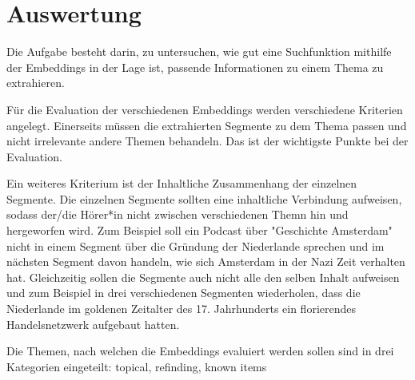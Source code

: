 \section{Auswertung}


Die Aufgabe besteht darin, zu untersuchen, wie gut eine Suchfunktion mithilfe der Embeddings in der Lage ist, passende Informationen zu einem Thema zu extrahieren.

Für die Evaluation der verschiedenen Embeddings werden verschiedene Kriterien angelegt.
Einerseits müssen die extrahierten Segmente zu dem Thema passen und nicht irrelevante andere Themen behandeln.
Das ist der wichtigste Punkte bei der Evaluation.

Ein weiteres Kriterium ist der Inhaltliche Zusammenhang der einzelnen Segmente.
Die einzelnen Segmente sollten eine inhaltliche Verbindung aufweisen, sodass der/die Hörer*in nicht zwischen verschiedenen Themn hin und hergeworfen wird.
Zum Beispiel soll ein Podcast über "Geschichte Amsterdam" nicht in einem Segment über die Gründung der Niederlande sprechen und im nächsten Segment davon handeln, wie sich Amsterdam in der Nazi Zeit verhalten hat.
Gleichzeitig sollen die Segmente auch nicht alle den selben Inhalt aufweisen und zum Beispiel in drei verschiedenen Segmenten wiederholen, dass die Niederlande im goldenen Zeitalter des 17. Jahrhunderts ein florierendes Handelsnetzwerk aufgebaut hatten.
 
Die Themen, nach welchen die Embeddings evaluiert werden sollen sind in drei Kategorien eingeteilt:
topical, refinding, known items \cite{jones2021}
